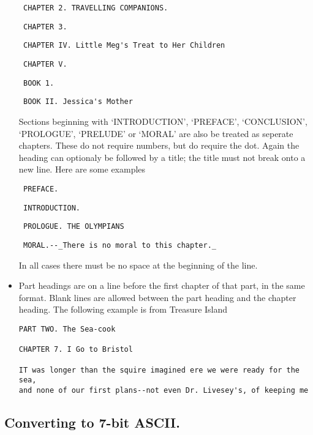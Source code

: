 \documentclass[a4paper,10pt]{paper}
\begin{document}
\begin{itemize}
        \begin{verbatim} CHAPTER 2. TRAVELLING COMPANIONS.\end{verbatim}
        \begin{verbatim} CHAPTER 3.\end{verbatim}
        \begin{verbatim} CHAPTER IV. Little Meg's Treat to Her Children\end{verbatim}
        \begin{verbatim} CHAPTER V.\end{verbatim}
        \begin{verbatim} BOOK 1.\end{verbatim}
        \begin{verbatim} BOOK II. Jessica's Mother\end{verbatim}
        Sections beginning with `INTRODUCTION', `PREFACE', `CONCLUSION', `PROLOGUE', `PRELUDE' or `MORAL' are also be treated as seperate chapters.
        These do not require numbers, but do require the dot.
        Again the heading can optionaly be followed by a title; the title must not break onto a new line.
        Here are some examples
        \begin{verbatim} PREFACE.\end{verbatim}
        \begin{verbatim} INTRODUCTION.\end{verbatim}
        \begin{verbatim} PROLOGUE. THE OLYMPIANS\end{verbatim}
        \begin{verbatim} MORAL.--_There is no moral to this chapter._\end{verbatim}
        In all cases there must be no space at the beginning of the line.
    \item Part headings are on a line before the first chapter of that part, in the same format. Blank lines are allowed between the part heading and the chapter heading.
          The following example is from Treasure Island
      \begin{verbatim}PART TWO. The Sea-cook

CHAPTER 7. I Go to Bristol

IT was longer than the squire imagined ere we were ready for the sea,
and none of our first plans--not even Dr. Livesey's, of keeping me\end{verbatim}
\end{itemize}

\subsection{Converting to 7-bit ASCII.}
\end{document}
